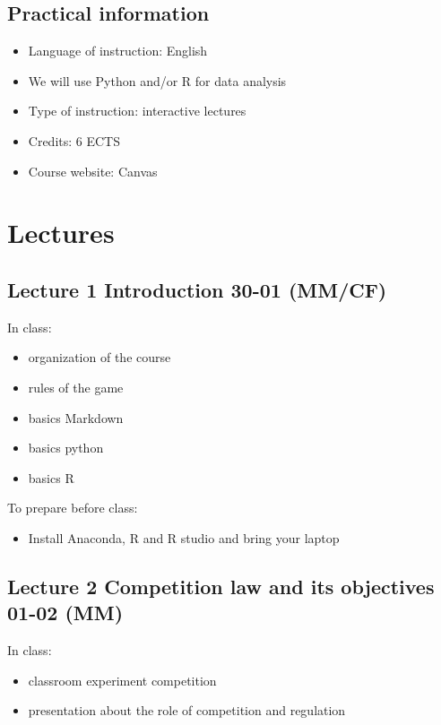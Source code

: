 \documentclass[]{book}
\providecommand{\tightlist}{%
  \setlength{\itemsep}{0pt}\setlength{\parskip}{0pt}}
\begin{document}
\section{Practical information}\label{practical-information}

\begin{itemize}
\tightlist
\item
  Language of instruction: English
\item
  We will use Python and/or R for data analysis
\item
  Type of instruction: interactive lectures
\item
  Credits: 6 ECTS
\item
  Course website: Canvas
\end{itemize}

\chapter{Lectures}\label{lectures}

\section{Lecture 1 Introduction 30-01
(MM/CF)}\label{lecture-1-introduction-30-01-mmcf}

In class:

\begin{itemize}
\tightlist
\item
  organization of the course
\item
  rules of the game
\item
  basics Markdown
\item
  basics python
\item
  basics R
\end{itemize}

To prepare before class:

\begin{itemize}
\tightlist
\item
  Install Anaconda, R and R studio and bring your laptop
\end{itemize}

\section{Lecture 2 Competition law and its objectives 01-02
(MM)}\label{lecture-2-competition-law-and-its-objectives-01-02-mm}

In class:

\begin{itemize}
\tightlist
\item
  classroom experiment competition
\item
  presentation about the role of competition and regulation
\end{itemize}
\end{document}
